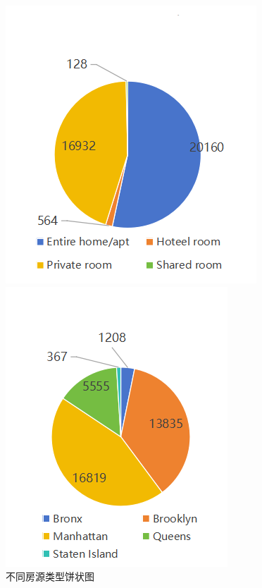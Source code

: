 \documentclass[12pt]{article}
\begin{document}
\begin{CJK}{UTF8}{gbsn}
	\begin{figure}[H]
		\centering
		\begin{minipage}[b]{0.45\textwidth}
			\centering
			\includegraphics[width=\linewidth]{pic/11.png}
			\caption{不同房源类型饼状图}
		\end{minipage}
		\hfill
		\begin{minipage}[b]{0.45\textwidth}
			\centering
			\includegraphics[width=\linewidth]{pic/12.png}

\end{minipage}
\end{figure}
\end{CJK}
\end{document}
